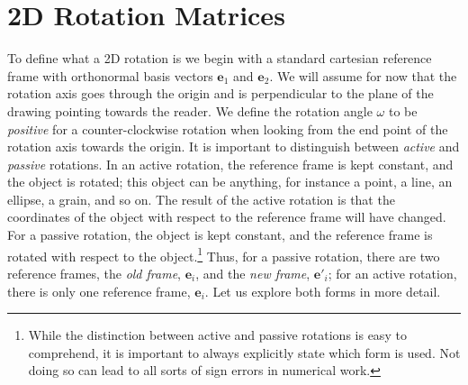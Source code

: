 \section{2D Rotation Matrices}

To define what a 2D rotation is we begin with a standard cartesian reference frame with orthonormal basis vectors $\mathbf{e}_1$ and $\mathbf{e}_2$. We will assume for now that the rotation axis goes through the origin and is perpendicular to the plane of the drawing pointing towards the reader.  We define the rotation angle $\omega$ to be \textit{positive} for a counter-clockwise rotation when looking from the end point of the rotation axis towards the origin.  It is important to distinguish between \textit{active} and \textit{passive} rotations. In an active rotation, the reference frame is kept constant, and the object is rotated; this object can be anything, for instance a point, a line, an ellipse, a grain, and so on.  The result of the active rotation is that the coordinates of the object with respect to the reference frame will have changed.  For a passive rotation, the object is kept constant, and the reference frame is rotated with respect to the object.\footnote{While the distinction between active and passive rotations is easy to comprehend, it is important to always explicitly state which form is used.  Not doing so can lead to all sorts of sign errors in numerical work.}  Thus, for a passive rotation, there are two reference frames, the \textit{old frame}, $\mathbf{e}_i$, and the \textit{new frame}, $\mathbf{e}'_i$; for an active rotation, there is only one reference frame, $\mathbf{e}_i$.  Let us explore both forms in more detail.


